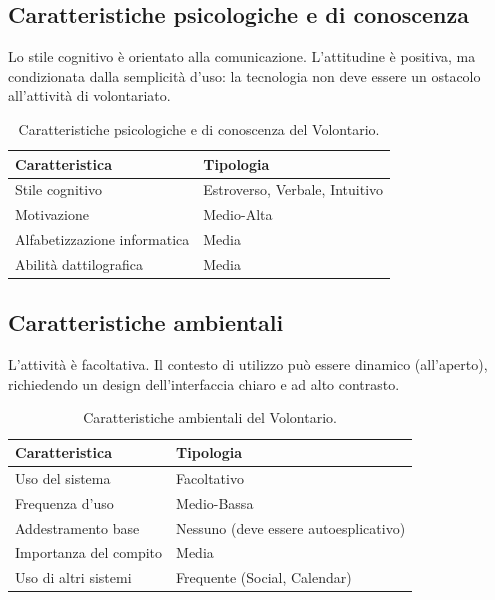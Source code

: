 \subsection{Caratteristiche psicologiche e di conoscenza}
Lo stile cognitivo è orientato alla comunicazione. L'attitudine è positiva, ma condizionata dalla semplicità d'uso: la tecnologia non deve essere un ostacolo all'attività di volontariato.

\begin{table}[H]
\centering
\begin{tabular}{|l|l|}
\hline
\textbf{Caratteristica} & \textbf{Tipologia} \\ \hline
Stile cognitivo & Estroverso, Verbale, Intuitivo \\ \hline
Motivazione & Medio-Alta \\ \hline
Alfabetizzazione informatica & Media \\ \hline
Abilità dattilografica & Media \\ \hline
\end{tabular}
\caption{Caratteristiche psicologiche e di conoscenza del Volontario.}
\label{tab:vol_psico_conoscenze}
\end{table}

\subsection{Caratteristiche ambientali}
L'attività è facoltativa. Il contesto di utilizzo può essere dinamico (all'aperto), richiedendo un design dell'interfaccia chiaro e ad alto contrasto.

\begin{table}[H]
\centering
\begin{tabular}{|l|l|}
\hline
\textbf{Caratteristica} & \textbf{Tipologia} \\ \hline
Uso del sistema & Facoltativo \\ \hline
Frequenza d'uso & Medio-Bassa \\ \hline
Addestramento base & Nessuno (deve essere autoesplicativo) \\ \hline
Importanza del compito & Media \\ \hline
Uso di altri sistemi & Frequente (Social, Calendar) \\ \hline
\end{tabular}
\caption{Caratteristiche ambientali del Volontario.}
\label{tab:vol_ambientali}
\end{table}

